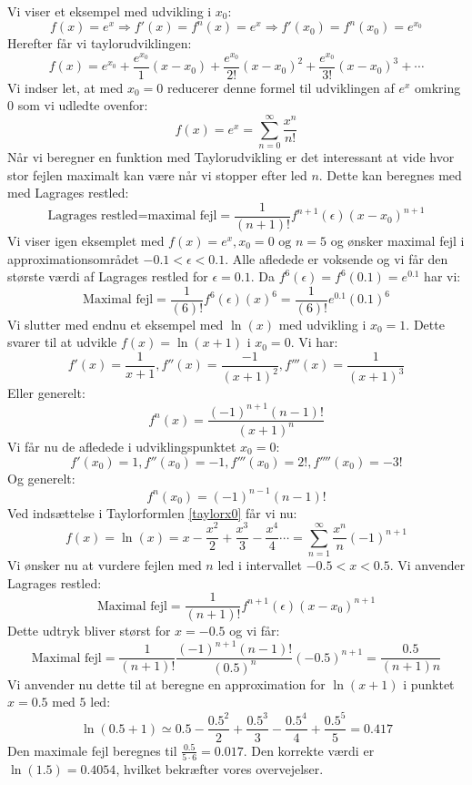 Vi viser et eksempel med udvikling i \(x_{0}\):
\[f(x)=e^{x} \Rightarrow f'(x)=f^{n}(x)=e^{x} \Rightarrow f'(x_{0})=f^{n}(x_{0})=e^{x_{0}}\]
Herefter får vi taylorudviklingen:
\[f(x)=e^{x_{0}}+\frac{e^{x_{0}}}{1}(x-x_{0})+\frac{e^{x_{0}}}{2!}(x-x_{0})^{2}+\frac{e^{x_{0}}}{3!}(x-x_{0})^{3}+\dotsm\]
Vi indser let, at med \(x_{0}=0\) reducerer denne formel til udviklingen af \(e^{x}\) omkring \(0\) som vi udledte ovenfor:
\[f(x)=e^{x}=\sum_{n=0}^{\infty}\frac{x^n}{n!}\]
Når vi beregner en funktion med Taylorudvikling er det interessant at vide hvor stor fejlen maximalt kan være når vi stopper efter led \(n\). Dette kan beregnes med med Lagrages restled:
\begin{equation}
\text{Lagrages restled=maximal fejl}=\frac{1}{(n+1)!}f^{n+1}(\epsilon)(x-x_{0})^{n+1}
\end{equation}
Vi viser igen eksemplet med \(f(x)=e^{x}, x_{0}=0 \text{ og } n=5\) og ønsker maximal fejl i approximationsområdet \(-0.1<\epsilon<0.1\). Alle afledede er voksende og vi får den største værdi af Lagrages restled for \(\epsilon=0.1\). Da \(f^{6}(\epsilon)=f^{6}(0.1)=e^{0.1}\) har vi:
\[\text{Maximal fejl}=\frac{1}{(6)!}f^{6}(\epsilon)(x)^{6}=\frac{1}{(6)!}e^{0.1}(0.1)^{6}\]
Vi slutter med endnu et eksempel med \(\ln(x)\) med udvikling i \(x_{0}=1\). Dette svarer til at udvikle \(f(x)=\ln(x+1)\) i \(x_{0}=0\). Vi har:
\[f'(x)=\frac{1}{x+1}, f''(x)=\frac{-1}{(x+1)^{2}}, f'''(x)=\frac{1}{(x+1)^{3}}\]
Eller generelt:
\[f^{n}(x)=\frac{(-1)^{n+1}(n-1)!}{(x+1)^{n}}\]
Vi får nu de afledede i udviklingspunktet \(x_{0}=0\):
\[f'(x_{0})=1, f''(x_{0})=-1,f'''(x_{0})=2!,f''''(x_{0})=-3!\]
Og generelt:
\[f^{n}(x_{0})=(-1)^{n-1}(n-1)!\]
Ved indsættelse i Taylorformlen \ref{taylorx0} får vi nu:
\[f(x)=\ln(x)=x-\frac{x^{2}}{2}+\frac{x^{3}}{3}-\frac{x^{4}}{4} \dotsm = \sum_{n=1}^{\infty}\frac{x^{n}}{n}(-1)^{n+1}\]
Vi ønsker nu at vurdere fejlen med \(n\) led i intervallet \(-0.5<x<0.5\). Vi anvender Lagrages restled:
\[\text{Maximal fejl}=\frac{1}{(n+1)!}f^{n+1}(\epsilon)(x-x_{0})^{n+1}\]
Dette udtryk bliver størst for \(x=-0.5\) og vi får:
\[\text{Maximal fejl}=\frac{1}{(n+1)!}\frac{(-1)^{n+1}(n-1)!}{(0.5)^{n}}(-0.5)^{n+1}=\frac{0.5}{(n+1)n}\]
Vi anvender nu dette til at beregne en approximation for \(\ln(x+1)\) i punktet \(x=0.5\) med \(5\) led:
\[\ln(0.5+1) \simeq 0.5-\frac{0.5^{2}}{2}+\frac{0.5^{3}}{3}-\frac{0.5^{4}}{4}+\frac{0.5^{5}}{5}=0.417\]
Den maximale fejl beregnes til \(\frac{0.5}{5 \cdot 6}=0.017\). Den korrekte værdi er \(\ln(1.5)=0.4054\), hvilket bekræfter vores overvejelser.
